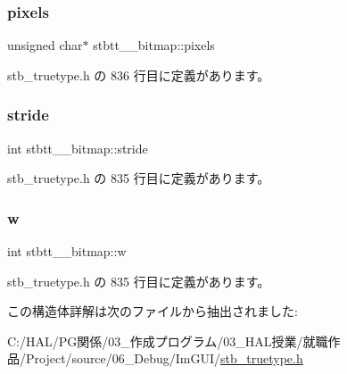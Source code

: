 \mbox{\label{structstbtt____bitmap_ae6be77625faf55b110eaaffde5c7733c}} 
\subsubsection{\texorpdfstring{pixels}{pixels}}
{\footnotesize\ttfamily unsigned char$\ast$ stbtt\+\_\+\+\_\+bitmap\+::pixels}



 stb\+\_\+truetype.\+h の 836 行目に定義があります。

\mbox{\label{structstbtt____bitmap_a48ee6b550ee4f1d85bfc32c62c0e9a98}} 
\subsubsection{\texorpdfstring{stride}{stride}}
{\footnotesize\ttfamily int stbtt\+\_\+\+\_\+bitmap\+::stride}



 stb\+\_\+truetype.\+h の 835 行目に定義があります。

\mbox{\label{structstbtt____bitmap_afbd607426f0a457b1a871ed902eeb926}} 
\subsubsection{\texorpdfstring{w}{w}}
{\footnotesize\ttfamily int stbtt\+\_\+\+\_\+bitmap\+::w}



 stb\+\_\+truetype.\+h の 835 行目に定義があります。



この構造体詳解は次のファイルから抽出されました\+:\begin{DoxyCompactItemize}
\item 
C\+:/\+H\+A\+L/\+P\+G関係/03\+\_\+作成プログラム/03\+\_\+\+H\+A\+L授業/就職作品/\+Project/source/06\+\_\+\+Debug/\+Im\+G\+U\+I/\mbox{\hyperlink{stb__truetype_8h}{stb\+\_\+truetype.\+h}}\end{DoxyCompactItemize}
